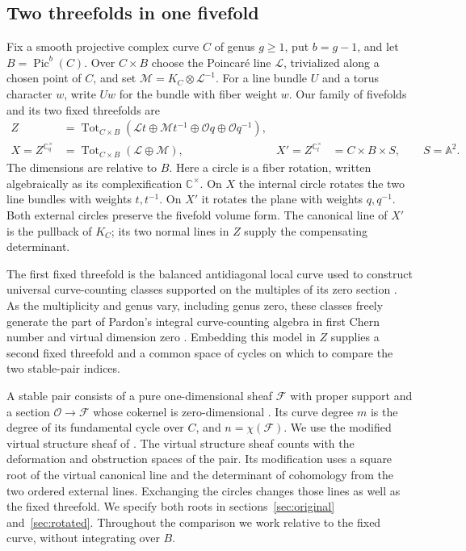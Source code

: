 \subsection{Two threefolds in one fivefold}
Fix a smooth projective complex curve $C$ of genus $g\geq1$, put $b=g-1$,
and let $B=\operatorname{Pic}^{b}(C)$. Over $C\times B$ choose the
Poincar\'e line $\mathcal L$, trivialized along a chosen point of $C$,
and set $\mathcal M=K_C\otimes\mathcal L^{-1}$. For a line bundle $U$
and a torus character $w$, write $Uw$ for the bundle with fiber weight $w$.
Our family of fivefolds and its two fixed threefolds are
\begin{align}
 Z&=\operatorname{Tot}_{C\times B}
       (\mathcal Lt\oplus\mathcal Mt^{-1}\oplus\mathcal Oq\oplus\mathcal Oq^{-1}),
       \nonumber\\
 X=Z^{\mathbb C_q^\times}
   &=\operatorname{Tot}_{C\times B}(\mathcal L\oplus\mathcal M),
 &X'=Z^{\mathbb C_t^\times}
   &= C\times B\times S,\qquad S=\mathbb A^2 .
 \label{eq:fixed}
\end{align}
The dimensions are relative to $B$. Here a circle is a fiber rotation,
written algebraically as its complexification $\mathbb C^\times$. On $X$
the internal circle rotates the two line bundles with weights $t,t^{-1}$.
On $X'$ it rotates the plane with weights $q,q^{-1}$. Both external
circles preserve the fivefold volume form. The canonical line of $X'$ is
the pullback of $K_C$; its two normal lines in $Z$ supply the compensating
determinant.

The first fixed threefold is the balanced antidiagonal local curve used
to construct universal curve-counting classes supported on the multiples
of its zero section \cite[\S2]{wuebben-antidiagonal}. As the multiplicity
and genus vary, including genus zero, these classes freely generate the
part of Pardon's integral curve-counting algebra in first
Chern number and virtual dimension zero
\cite[Theorem~1.1]{wuebben-integral}. Embedding this model in $Z$ supplies
a second fixed threefold and a common space of cycles on which to
compare the two stable-pair indices.

A stable pair consists of a pure one-dimensional sheaf $\mathcal F$ with
proper support and a section $\mathcal O\to\mathcal F$ whose cokernel is
zero-dimensional \cite{pt}. Its curve degree $m$ is the degree of its
fundamental cycle over $C$, and $n=\chi(\mathcal F)$.
We use the modified virtual structure sheaf of \cite{no}.
The virtual structure sheaf counts with the deformation and obstruction
spaces of the pair. Its modification uses a square root of the virtual
canonical line and the determinant of cohomology from the two ordered
external lines. Exchanging the circles changes those lines as well as the
fixed threefold. We specify both roots in sections~\ref{sec:original}
and~\ref{sec:rotated}. Throughout the comparison we work relative to the
fixed curve, without integrating over $B$.

